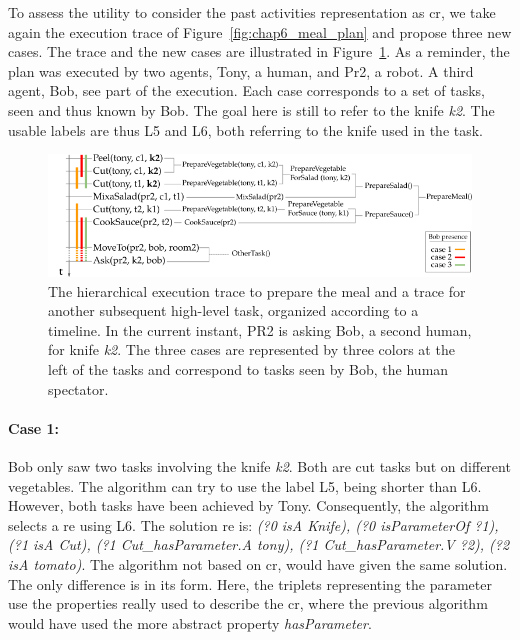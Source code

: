 To assess the utility to consider the past activities representation as \acrlong{cr}, we take again the execution trace of Figure~\ref{fig:chap6_meal_plan} and propose three new cases. The trace and the new cases are illustrated in Figure~\ref{fig:chap7_meal_plan}. As a reminder, the plan was executed by two agents, Tony, a human, and Pr2, a robot. A third agent, Bob, see part of the execution. Each case corresponds to a set of tasks, seen and thus known by Bob. The goal here is still to refer to the knife \textit{k2}. The usable labels are thus L5 and L6, both referring to the knife used in the task.

\begin{figure}[ht!]
\centering
\includegraphics[width=\textwidth]{figures/chapter7/prepare_meal_plan.png}
\caption{\label{fig:chap7_meal_plan} The hierarchical execution trace to prepare the meal and a trace for another subsequent high-level task, organized according to a timeline. In the current instant, PR2 is asking Bob, a second human, for knife \textit{k2}. The three cases are represented by three colors at the left of the tasks and correspond to tasks seen by Bob, the human spectator.}
\end{figure}

\paragraph{Case 1:} Bob only saw two tasks involving the knife \textit{k2}. Both are cut tasks but on different vegetables. The algorithm can try to use the label L5, being shorter than L6. However, both tasks have been achieved by Tony. Consequently, the algorithm selects a \acrshort{re} using L6. The solution \acrshort{re} is: \textit{(?0 isA Knife), (?0 isParameterOf ?1), (?1 isA Cut), (?1 Cut\_hasParameter.A tony), (?1 Cut\_hasParameter.V ?2), (?2 isA tomato)}. The algorithm not based on \acrshort{cr}, would have given the same solution. The only difference is in its form. Here, the triplets representing the parameter use the properties really used to describe the \acrshort{cr}, where the previous algorithm would have used the more abstract property \textit{hasParameter}.

